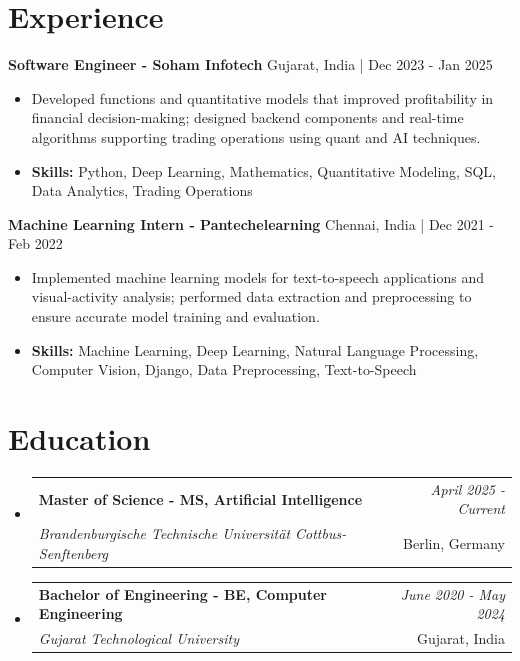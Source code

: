 \documentclass[a4paper,11pt]{article}
\makeatletter
\newcommand{\resumeSubheading}[4]{
\vspace{0.5mm}\item
    \begin{tabular*}{\linewidth}[t]{l@{\extracolsep{\fill}}r}
        \textbf{#1} & \textit{\footnotesize{#4}} \\
        \textit{\footnotesize{#3}} &  \footnotesize{#2}\\
    \end{tabular*}
    \vspace{-2.4mm}
}
\makeatother
\begin{document}
\section{\textbf{Experience}}


\vspace{1mm}
  \textbf{Software Engineer - Soham Infotech} \hfill Gujarat, India | Dec 2023 - Jan 2025
\vspace{-1.5mm} %
\begin{itemize}
  \item Developed functions and quantitative models that improved profitability in financial decision-making; designed backend components and real-time algorithms supporting trading operations using quant and AI techniques.

\vspace{-2mm}
  \item \textbf{Skills:} Python, Deep Learning, Mathematics, Quantitative Modeling, SQL, Data Analytics, Trading Operations
\end{itemize}

\vspace{1mm}
  \textbf{Machine Learning Intern - Pantechelearning} \hfill Chennai, India | Dec 2021 - Feb 2022
\vspace{-1.5mm} %
\begin{itemize}
  \item Implemented machine learning models for text-to-speech applications and visual-activity analysis; performed data extraction and preprocessing to ensure accurate model training and evaluation.
\vspace{-2mm}
  \item \textbf{Skills:} Machine Learning, Deep Learning, Natural Language Processing, Computer Vision, Django, Data Preprocessing, Text-to-Speech
\end{itemize}\section{\textbf{Education}}
\vspace{-0.4mm}

\begin{itemize}[leftmargin=0.15in, label={}]
\resumeSubheading
{Master of Science - MS, Artificial Intelligence }{Berlin, Germany}
{Brandenburgische Technische Universität Cottbus-Senftenberg  }{April 2025 - Current}

\vspace{1.0mm} %
\resumeSubheading
{Bachelor of Engineering - BE, Computer Engineering  }{Gujarat, India}
{Gujarat Technological University }{June 2020 - May 2024}

\end{itemize}
\end{document}

